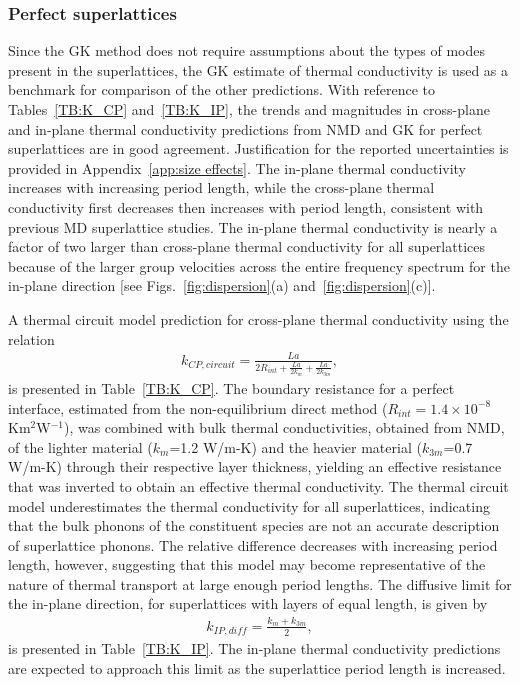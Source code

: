 \documentclass[aps,prb,preprint,preprintnumbers,amsmath,amssymb,floatfix,superscriptaddress]{revtex4}
\begin{document}
\subsubsection{Perfect superlattices}
Since the GK method does not require assumptions about the types of modes present in the superlattices, the GK estimate of thermal conductivity is used as a benchmark for comparison of the other predictions. With reference to Tables~\ref{TB:K_CP} and~\ref{TB:K_IP}, the trends and magnitudes in cross-plane and in-plane thermal conductivity predictions from NMD and GK for perfect superlattices are in good agreement. Justification for the reported uncertainties is provided in Appendix~\ref{app:size effects}. The in-plane thermal conductivity increases with increasing period length, while the cross-plane thermal conductivity first decreases then increases with period length, consistent with previous MD superlattice studies.\cite {PhysRevB.77.184302,PhysRevB.72.174302} The in-plane thermal conductivity is nearly a factor of two larger than cross-plane thermal conductivity for all superlattices because of the larger group velocities across the entire frequency spectrum for the in-plane direction [see Figs.~\ref{fig:dispersion}(a) and~\ref{fig:dispersion}(c)]. 

A thermal circuit model prediction for cross-plane thermal conductivity using the relation\cite{PhysRevB.77.184302}
\begin{equation}\label{EQ:TCircuit}
\begin{split}
k_{CP,circuit}= \frac{La}{2R_{int}+\frac{La}{2k_m}+\frac{La}{2k_{3m}}},
\end{split}
\end{equation}
is presented in Table~\ref{TB:K_CP}. The boundary resistance for a perfect interface, estimated from the non-equilibrium direct method ($R_{int}=1.4\times10^{-8}$ Km$^2$W$^{-1}$),\cite{simonDM} was combined with bulk thermal conductivities, obtained from NMD, of the lighter material ($k_{m}$=1.2 W/m-K) and the heavier material ($k_{3m}$=0.7 W/m-K) through their respective layer thickness, yielding an effective resistance that was inverted to obtain an effective thermal conductivity. The thermal circuit model underestimates the thermal conductivity for all superlattices, indicating that the bulk phonons of the constituent species are not an accurate description of superlattice phonons. The relative difference decreases with increasing period length, however, suggesting that this model may become representative of the nature of thermal transport at large enough period lengths.
The diffusive limit for the in-plane direction, for superlattices with layers of equal length, is given by \cite{PhysRevB.77.184302}
\begin{equation}\label{EQ:TCircuit}
\begin{split}
k_{IP,diff}= \frac{k_m+k_{3m}}{2},
\end{split}
\end{equation}
is presented in Table~\ref{TB:K_IP}. The in-plane thermal conductivity predictions are expected to approach this limit as the superlattice period length is increased.
\end{document}
